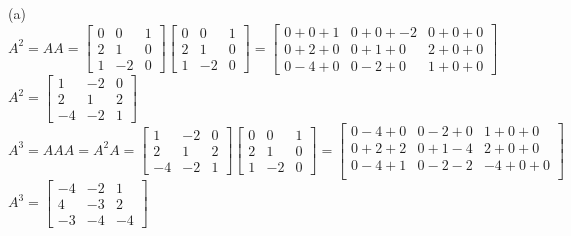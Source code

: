 \documentclass[addpoints]{exam}
\begin{document}
\begin{sloppypar}
\begin{questions}
\begin{solution}
        (a) $ A^2 = AA = \begin{bmatrix}
            0 & 0 & 1 \\ 2 & 1 & 0 \\ 1 & -2 & 0
        \end{bmatrix} \begin{bmatrix}
            0 & 0 & 1 \\ 2 & 1 & 0 \\ 1 & -2 & 0
        \end{bmatrix}  = \begin{bmatrix}
            0 + 0 + 1 & 0 + 0 + -2 & 0 + 0 + 0 \\
            0 + 2 + 0 & 0 + 1 + 0 & 2 + 0 + 0 \\ 
            0 - 4 + 0 & 0 - 2 + 0 & 1 + 0 + 0 
        \end{bmatrix} $ \\ 
        $ A^2 = \begin{bmatrix}
            1 & -2 & 0 \\ 2 & 1 & 2 \\ -4 & -2 & 1
        \end{bmatrix} $ \\ 
        $ A^3 = AAA = A^2A = \begin{bmatrix}
            1 & -2 & 0 \\ 2 & 1 & 2 \\ -4 & -2 & 1
        \end{bmatrix} \begin{bmatrix}
            0 & 0 & 1 \\ 2 & 1 & 0 \\ 1 & -2 & 0
        \end{bmatrix} = \begin{bmatrix}
            0 - 4 + 0 & 0 - 2 + 0 & 1 + 0 + 0 \\ 
            0 + 2 + 2 & 0 + 1 - 4 & 2 + 0 + 0 \\ 
            0 - 4 + 1 & 0 - 2 - 2 & - 4 + 0 + 0\\
        \end{bmatrix} $ \\ 
        $ A^3 = \begin{bmatrix}
            -4 & -2 & 1 \\ 4 & -3 & 2 \\ -3 & -4 & -4
        \end{bmatrix} $


\end{solution}
\end{questions}
\end{sloppypar}
\end{document}
